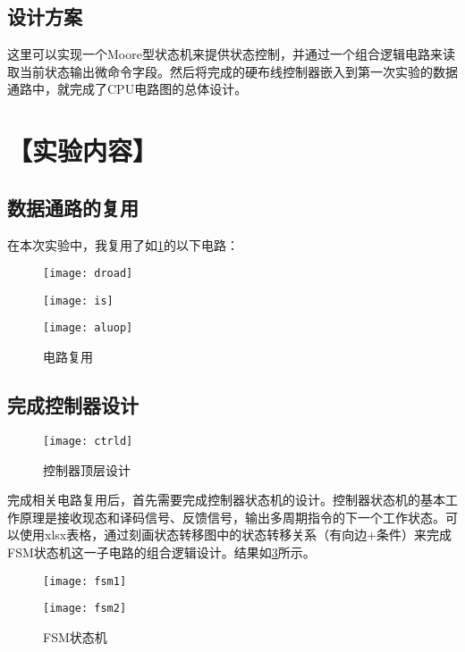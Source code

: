\documentclass[withoutpreface]{cumcmthesis}
\begin{document}
\subsection{设计方案}
这里可以实现一个Moore型状态机来提供状态控制，并通过一个组合逻辑电路来读取当前状态输出微命令字段。然后将完成的硬布线控制器嵌入到第一次实验的数据通路中，就完成了CPU电路图的总体设计。
\section{【实验内容】}
\subsection{数据通路的复用}
在本次实验中，我复用了如\cref{fig:reuse}的以下电路：
\begin{figure}[!h]
    \centering
    \begin{minipage}[c]{0.3\textwidth}
        \centering
        \texttt{[image: droad]}
        \label{fig:dr}
    \end{minipage}
    \begin{minipage}[c]{0.3\textwidth}
        \centering
        \texttt{[image: is]}
        \label{fig:is}
    \end{minipage}
    \begin{minipage}[c]{0.3\textwidth}
        \centering
        \texttt{[image: aluop]}
        \label{fig:aluop}
    \end{minipage}
    \caption{电路复用}
    \label{fig:reuse}
\end{figure}
\subsection{完成控制器设计}
\begin{figure}[!h]
	\centering
	\texttt{[image: ctrld]}
	\caption{控制器顶层设计}
	\label{fig:ctrl-design}
\end{figure}
完成相关电路复用后，首先需要完成控制器状态机的设计。控制器状态机的基本工作原理是接收现态和译码信号、反馈信号，输出多周期指令的下一个工作状态。可以使用xlsx表格，通过刻画状态转移图中的状态转移关系（有向边+条件）来完成FSM状态机这一子电路的组合逻辑设计。结果如\cref{fig:fsm}所示。
\begin{figure}[!h]
\centering
\begin{minipage}[c]{0.2\textwidth}
	\centering
	\texttt{[image: fsm1]}
	\label{fig:fsm1}
\end{minipage}
\begin{minipage}[c]{0.2\textwidth}
	\centering
	\texttt{[image: fsm2]}
	\label{fig:fsm2}
\end{minipage}
\caption{FSM状态机}
\label{fig:fsm}
\end{figure}
\end{document}
